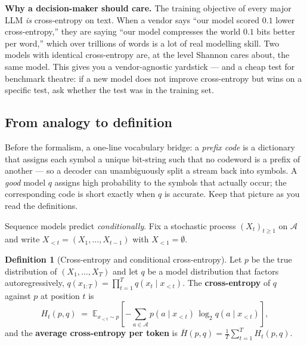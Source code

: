 \documentclass[12pt,a4paper]{article}
\theoremstyle{plain}
\theoremstyle{definition}
\newtheorem{definition}[theorem]{Definition}
\begin{document}
\begin{intuition}
\medskip
\textbf{Why a decision-maker should care.}  The training objective
of every major LLM \emph{is} cross-entropy on text.  When a vendor
says ``our model scored $0.1$ lower cross-entropy,'' they are saying
``our model compresses the world $0.1$ bits better per word,'' which
over trillions of words is a lot of real modelling skill.  Two
models with identical cross-entropy are, at the level Shannon cares
about, the same model.  This gives you a vendor-agnostic yardstick
--- and a cheap test for benchmark theatre: if a new model does not
improve cross-entropy but wins on a specific test, ask whether the
test was in the training set.
\end{intuition}


\subsection*{From analogy to definition}

Before the formalism, a one-line vocabulary bridge: a \emph{prefix
code} is a dictionary that assigns each symbol a unique bit-string
such that no codeword is a prefix of another --- so a decoder can
unambiguously split a stream back into symbols.  A \emph{good} model
$q$ assigns high probability to the symbols that actually occur;
the corresponding code is short exactly when $q$ is accurate.  Keep
that picture as you read the definitions.

Sequence models predict \emph{conditionally}.  Fix a stochastic
process $(X_t)_{t \ge 1}$ on $\mathcal{A}$ and write
$X_{<t} = (X_1, \dots, X_{t-1})$ with $X_{<1} = \emptyset$.

\begin{definition}[Cross-entropy and conditional cross-entropy]
\label{def:cross-ent}
Let $p$ be the true distribution of $(X_1, \dots, X_T)$ and let $q$
be a model distribution that factors autoregressively,
$q(x_{1:T}) = \prod_{t=1}^{T} q(x_t \mid x_{<t})$.  The
\textbf{cross-entropy} of $q$ against $p$ at position $t$ is
\begin{equation}
  H_t(p, q)
  \;=\; \mathbb{E}_{x_{<t}\sim p}\!\left[
    -\sum_{a\in\mathcal{A}} p(a \mid x_{<t})\,\log_2 q(a \mid x_{<t})
  \right],
  \label{eq:cross-ent}
\end{equation}
and the \textbf{average cross-entropy per token} is
$\overline{H}(p,q) = \tfrac{1}{T}\sum_{t=1}^{T} H_t(p,q)$.
\end{definition}
\end{document}
